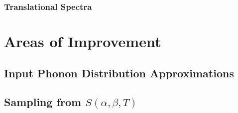 \documentclass[../master.tex]{subfiles}
\begin{document}






			
			\subsubsection{Translational Spectra}

	\section{Areas of Improvement}
		\subsection{Input Phonon Distribution Approximations}

		\subsection{Sampling from $S(\alpha,\beta,T)$}
\end{document}
